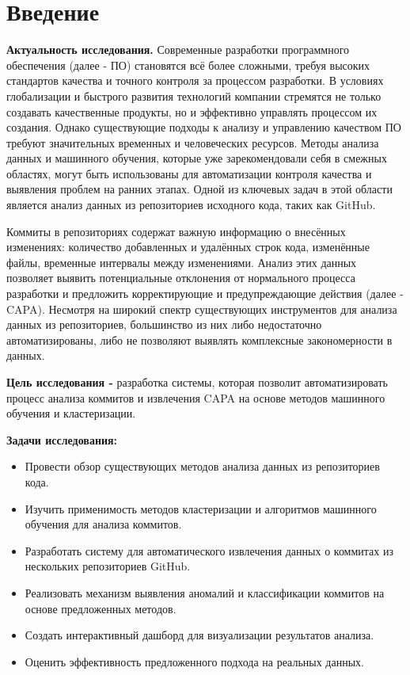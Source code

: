 \chapter*{Введение} %
\setlength\parindent{1.5em}

\par \textbf{Актуальность исследования.} Современные разработки программного обеспечения (далее - ПО) становятся всё более сложными, требуя высоких стандартов качества и точного контроля за процессом разработки. В условиях глобализации и быстрого развития технологий компании стремятся не только создавать качественные продукты, но и эффективно управлять процессом их создания. Однако существующие подходы к анализу и управлению качеством ПО требуют значительных временных и человеческих ресурсов. Методы анализа данных и машинного обучения, которые уже зарекомендовали себя в смежных областях, могут быть использованы для автоматизации контроля качества и выявления проблем на ранних этапах. Одной из ключевых задач в этой области является анализ данных из репозиториев исходного кода, таких как GitHub.

Коммиты в репозиториях содержат важную информацию о внесённых изменениях: количество добавленных и удалённых строк кода, изменённые файлы, временные интервалы между изменениями. Анализ этих данных позволяет выявить потенциальные отклонения от нормального процесса разработки и предложить корректирующие и предупреждающие действия (далее - CAPA). Несмотря на широкий спектр существующих инструментов для анализа данных из репозиториев, большинство из них либо недостаточно автоматизированы, либо не позволяют выявлять комплексные закономерности в данных.

\textbf{Цель исследования -} разработка системы, которая позволит автоматизировать процесс анализа коммитов и извлечения CAPA на основе методов машинного обучения и кластеризации.

\textbf{Задачи исследования:}
\begin{itemize}
	\item Провести обзор существующих методов анализа данных из репозиториев кода.
	\item Изучить применимость методов кластеризации и алгоритмов машинного обучения для анализа коммитов.
	\item Разработать систему для автоматического извлечения данных о коммитах из нескольких репозиториев GitHub.
	\item Реализовать механизм выявления аномалий и классификации коммитов на основе предложенных методов.
	\item Создать интерактивный дашборд для визуализации результатов анализа.
	\item Оценить эффективность предложенного подхода на реальных данных.
\end{itemize}

